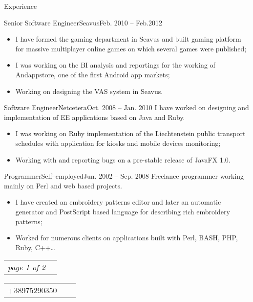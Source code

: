 \documentclass[]{mcdowellcv}
\begin{document}
\begin{cvsection}{Experience}
\begin{cvsubsection}{Senior Software Engineer}{Seavus}{Feb. 2010 -- Feb.2012}
\begin{itemize}
                \item I have formed the gaming department in Seavus and built gaming platform for massive multiplayer online games on which several games were published;
                \item I was working on the BI analysis and reportings for the working of Andappstore, one of the first Android app markets;
                \item Working on designing the VAS system in Seavus.
            \end{itemize}
        \end{cvsubsection}
        \begin{cvsubsection}{Software Engineer}{Netcetera}{Oct. 2008 -- Jan. 2010}
            I have worked on designing and implementation of EE applications based on Java and Ruby.
            \begin{itemize}
                \item I was working on Ruby implementation of the Liechtenstein public transport schedules with application for kiosks and mobile devices monitoring;
                \item Working with and reporting bugs on a pre-stable release of JavaFX 1.0.
            \end{itemize}
        \end{cvsubsection}
        \begin{cvsubsection}{Programmer}{Self--employed}{Jun. 2002 -- Sep. 2008}
            Freelance programmer working mainly on Perl and web based projects.
            \begin{itemize}
                \item I have created an embroidery patterns editor and later an automatic generator and PostScript based language for describing rich embroidery patterns;
                \item Worked for numerous clients on applications built with Perl, BASH, PHP, Ruby, C++\ldots
            \end{itemize}
        \end{cvsubsection}
    \end{cvsection}

    \vfill
    \begin{tabu} to 1\textwidth {X[l,m] X[r,m]}
        \textit{page 1 of 2}
    \end{tabu}
    \clearpage

    \begin{center}
        \begin{tabu} to 1\textwidth {X[l,m] X[c,m] X[r,m]}
            \small{+38975290350} &
            \textbf{\Large{}} &
            \small{} \linebreak
        \end{tabu}
    \end{center}
    \vspace*{20pt}
\end{document}
